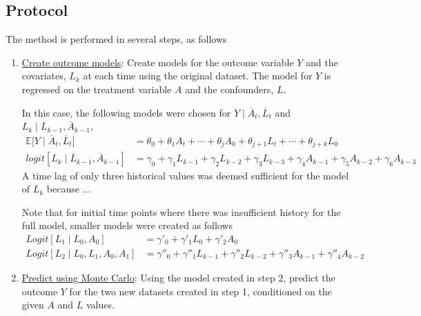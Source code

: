 \subsection{Protocol} 
The method is performed in several steps, as follows 
\begin{enumerate}  

\item \underline{Create outcome models}: Create models for the outcome variable $Y$ and the covariates, $L_k$ at each time using the original dataset.  The model for $Y$ is regressed on the treatment variable $A$ and the confounders, $L$. 

In this case, the following models were chosen for $Y \mid  \overline{A}_t, \overline{L}_t$ and $L_k \mid \overline{L}_{k-1}, \overline{A}_{k-1}$, 
\begin{align} 
\mathbb{E} \big[Y \mid \overline{A}_t, \overline{L}_t \big] &= \theta_{0} + \theta_1 A_{t} + \cdots + \theta_j A_0 + \theta_{j+1} L_t + \cdots + \theta_{j+k} L_0 \label{eq:2} \\ 
logit[L_k \mid \overline{L}_{k-1}, \overline{A}_{k-1}] &= \gamma_0 + \gamma_1 L_{k-1} + \gamma_2 L_{k-2} + \gamma_3 L_{k-3}  + \gamma_4 A_{k-1} + \gamma_5 A_{k-2} + \gamma_6 A_{k-3} \label{eq:3} 
\end{align} 
A time lag of only three historical values was deemed sufficient for the model of $L_k$ because ... 


\vspace{1cm}
Note that for initial time points where there was insufficient history for the full model, smaller models were created as follows 
\begin{align} 
Logit[L_1 \mid L_0, A_0]  &= \gamma'_0 + \gamma'_1 L_0 +  \gamma'_2 A_0 \label{eq:4} \\
Logit[L_2 \mid L_0, L_1, A_0, A_1] &= \gamma''_0 + \gamma''_1 L_{k-1} + \gamma''_2 L_{k-2}   + \gamma''_3 A_{k-1} + \gamma''_4 A_{k-2} \label{eq:5}
\end{align}


\item \underline{Predict using Monte Carlo}: Using the model created in step 2, predict the outcome $Y$ for the two new datasets created in step 1, conditioned on the given $A$ and $L$ values.  


\end{enumerate}
